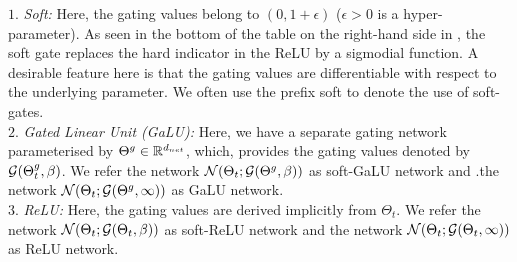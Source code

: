 $1.$ \emph{Soft:} Here, the gating values belong to $(0,1+\epsilon)$ ($\epsilon>0$ is a hyper-parameter). As seen in the bottom of the table on the right-hand side in , the soft gate replaces the hard indicator in the ReLU by a sigmodial function. A desirable feature here is that the gating values are differentiable with respect to the underlying parameter. We often use the prefix soft to denote the use of soft-gates.\\
$2.$ \emph{Gated Linear Unit (GaLU):} Here, we have a separate gating network parameterised by ${\Theta}^g\in\mathbb{R}^{d_{net}}$, which, provides the gating values denoted by $\mathcal{G}({\Theta}^g_t,\beta)$. We refer the network $\mathcal{N}(\Theta_t;\mathcal{G}({\Theta}^g,\beta))$ as soft-GaLU network and .the network $\mathcal{N}(\Theta_t;\mathcal{G}({\Theta}^g,\infty))$ as GaLU network.\\
$3.$ \emph{ReLU:} Here, the gating values are derived implicitly from $\Theta_t$. We refer the network $\mathcal{N}(\Theta_t;\mathcal{G}(\Theta_t,\beta))$ as soft-ReLU network and the network $\mathcal{N}(\Theta_t;\mathcal{G}(\Theta_t,\infty))$ as ReLU network.

